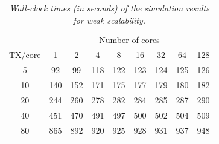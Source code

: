 \begin{table}
\caption{\textit{\emph{Wall-clock times (in seconds) of the simulation results
for weak scalability.\label{tab:results_weak_scaling}}}}


\centering

{\footnotesize }%
\begin{tabular}{ccccccccc}
\cmidrule{2-9} 
 & \multicolumn{8}{c}{{\footnotesize Number of cores}}\tabularnewline\addlinespace
\midrule 
{\footnotesize TX/core} & {\footnotesize 1} & {\footnotesize 2} & {\footnotesize 4} & {\footnotesize 8} & {\footnotesize 16} & {\footnotesize 32} & {\footnotesize 64} & {\footnotesize 128}\tabularnewline
\midrule
{\footnotesize 5} & {\footnotesize 92} & {\footnotesize 99} & {\footnotesize 118} & {\footnotesize 122} & {\footnotesize 123} & {\footnotesize 124} & {\footnotesize 125} & {\footnotesize 126}\tabularnewline
{\footnotesize 10} & {\footnotesize 140} & {\footnotesize 152} & {\footnotesize 171} & {\footnotesize 175} & {\footnotesize 177} & {\footnotesize 179} & {\footnotesize 180} & {\footnotesize 182}\tabularnewline
{\footnotesize 20} & {\footnotesize 244} & {\footnotesize 260} & {\footnotesize 278} & {\footnotesize 282} & {\footnotesize 284} & {\footnotesize 285} & {\footnotesize 287} & {\footnotesize 290}\tabularnewline
{\footnotesize 40} & {\footnotesize 451} & {\footnotesize 470} & {\footnotesize 491} & {\footnotesize 497} & {\footnotesize 500} & {\footnotesize 502} & {\footnotesize 504} & {\footnotesize 509}\tabularnewline
{\footnotesize 80} & {\footnotesize 865} & {\footnotesize 892} & {\footnotesize 920} & {\footnotesize 925} & {\footnotesize 928} & {\footnotesize 931} & {\footnotesize 937} & {\footnotesize 948}\tabularnewline
\bottomrule
\end{tabular}
\end{table}


